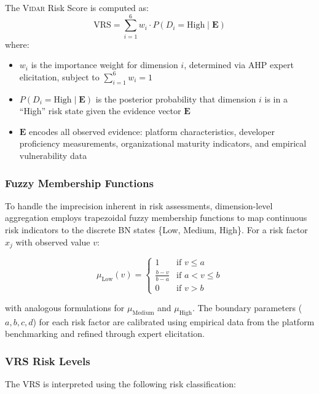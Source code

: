 \documentclass[preprint,review,12pt]{elsarticle}
\newcommand{\vidar}{\textsc{Vidar}}
\begin{document}
The \vidar{} Risk Score is computed as:
\begin{equation}
    \text{VRS} = \sum_{i=1}^{6} w_i \cdot P(D_i = \text{High} \mid \mathbf{E})
    \label{eq:vrs}
\end{equation}
where:
\begin{itemize}
    \item $w_i$ is the importance weight for dimension $i$, determined via AHP expert elicitation, subject to $\sum_{i=1}^{6} w_i = 1$
    \item $P(D_i = \text{High} \mid \mathbf{E})$ is the posterior probability that dimension $i$ is in a ``High'' risk state given the evidence vector $\mathbf{E}$
    \item $\mathbf{E}$ encodes all observed evidence: platform characteristics, developer proficiency measurements, organizational maturity indicators, and empirical vulnerability data
\end{itemize}

\subsubsection{Fuzzy Membership Functions}

To handle the imprecision inherent in risk assessments, dimension-level aggregation employs trapezoidal fuzzy membership functions to map continuous risk indicators to the discrete BN states \{Low, Medium, High\}. For a risk factor $x_j$ with observed value $v$:

\begin{equation}
    \mu_{\text{Low}}(v) = \begin{cases} 1 & \text{if } v \leq a \\ \frac{b - v}{b - a} & \text{if } a < v \leq b \\ 0 & \text{if } v > b \end{cases}
    \label{eq:fuzzy}
\end{equation}

with analogous formulations for $\mu_{\text{Medium}}$ and $\mu_{\text{High}}$. The boundary parameters ($a, b, c, d$) for each risk factor are calibrated using empirical data from the platform benchmarking and refined through expert elicitation.


\subsubsection{VRS Risk Levels}

The VRS is interpreted using the following risk classification:
\end{document}
